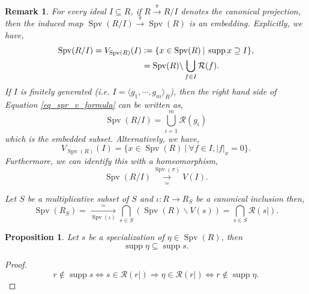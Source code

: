 \documentclass[8pt]{article}
\numberwithin{equation}{section}
\newtheorem{proposition}{Proposition}[subsection]
\newtheorem{remark}{Remark}[subsection]
\DeclareMathOperator{\supp}{supp}
\DeclareMathOperator{\Spv}{Spv}
\newcommand{\defeq}{\vcentcolon=}
\newcommand{\cR}[0]{\mathcal{R}}
\newcommand{\sep}[0]{\:|\:}
\newcommand{\ab}[1]{\vert #1 \vert}
\begin{document}
\begin{remark}
    \label{fact_6_3}
    For every ideal $I\subseteq R$, if $R\stackrel{\pi}{\to}R/I$ denotes the canonical projection, then the induced map $\Spv(R/I)\stackrel{\pi}{\to} \Spv(R)$ is an embedding. Explicitly, we have,
    \begin{align}
        \Spv(R/I) = V_{\Spv(R)}(I) &\defeq\{x\in\Spv(R)\sep \supp x\supseteq I\},\\
        & = \Spv(R)\backslash\bigcup_{f\in I}\cR(f).\label{eq_spr_v_formula}
    \end{align}
    If $I$ is finitely generated (i.e. $I = \langle g_1,\cdots,g_m\rangle_R$), then the right hand side of Equation \eqref{eq_spr_v_formula} can be written as,
    \begin{equation*}
        \Spv(R/I) = \bigcup_{i=1}^m \cR(g_i)
    \end{equation*}
    which is the embedded subset. Alternatively, we have,
    \begin{equation*}
        V_{\Spv(R)}(I) = \{x\in\Spv(R)\sep \forall f\in I, \ab{f}_x = 0\}.
    \end{equation*}
    Furthermore, we can identify this with a homeomorphism,
    \begin{equation*}
        \Spv(R/I)\underset{\simeq}{\stackrel{\Spv(\pi)}{\to}} V(I).
    \end{equation*}
    \par Let $S$ be a multiplicative subset of $S$ and $\iota:R\to R_S$ be a canonical inclusion then,
    \begin{equation*}
        \Spv(R_S) = \underset{\Spv(\iota)}{\stackrel{\simeq}{\to}}\bigcap_{s\in S}(\Spv(R)\backslash V(s)) = \bigcap_{s\in S}\cR(s|).
    \end{equation*}
\end{remark}

\begin{proposition}
    \label{fact_6_4}
    Let $s$ be a specialization of $\eta\in\Spv(R)$, then 
    \begin{equation*}
        \supp\eta\subseteq \supp s.
    \end{equation*}
\end{proposition}
\begin{proof}
    \begin{equation*}
        r\not\in\supp s\iff s\in\cR(r|)\Rightarrow \eta\in\cR(r|)\iff r\not\in\supp\eta.
    \end{equation*}
\end{proof}
\end{document}
